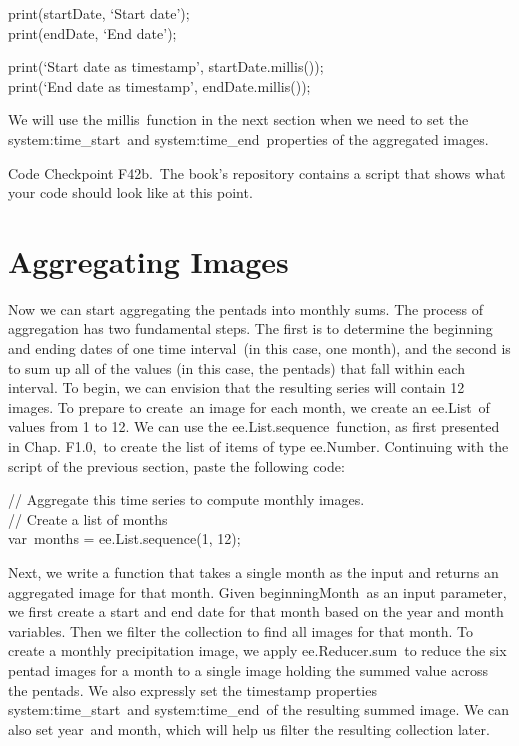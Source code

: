 \documentclass[
  letterpaper,
  DIV=11,
  numbers=noendperiod]{scrreprt}
\begin{document}
print(startDate, `Start date');\\
print(endDate, `End date');

print(`Start date as timestamp', startDate.millis());\\
print(`End date as timestamp', endDate.millis());

We will use the millis~function in the next section when we need to set
the system:time\_start~and system:time\_end~properties of the aggregated
images.

\begin{tcolorbox}[enhanced jigsaw, left=2mm, breakable, rightrule=.15mm, opacityback=0, colframe=quarto-callout-note-color-frame, colbacktitle=quarto-callout-note-color!10!white, arc=.35mm, opacitybacktitle=0.6, toptitle=1mm, colback=white, leftrule=.75mm, title=\textcolor{quarto-callout-note-color}{\faInfo}\hspace{0.5em}{Note}, toprule=.15mm, bottomtitle=1mm, titlerule=0mm, bottomrule=.15mm, coltitle=black]

Code Checkpoint F42b.~The book's repository contains a script that shows
what your code should look like at this point.

\end{tcolorbox}

\hypertarget{aggregating-images}{%
\section{Aggregating Images}\label{aggregating-images}}

Now we can start aggregating the pentads into monthly sums. The process
of aggregation has two fundamental steps. The first is to determine the
beginning and ending dates of one time interval~(in this case, one
month), and the second is to sum up all of the values (in this case, the
pentads) that fall within each interval. To begin, we can envision that
the resulting series will contain 12 images. To prepare to create~an
image for each month, we create an ee.List~of values from 1 to 12. We
can use the ee.List.sequence~function, as first presented in Chap.
F1.0,~to create the list of items of type ee.Number. Continuing with the
script of the previous section, paste the following code:

// Aggregate this time series to compute monthly images.\\
// Create a list of months\\
var~months = ee.List.sequence(1, 12);

Next, we write a function that takes a single month as the input and
returns an aggregated image for that month. Given beginningMonth~as an
input parameter, we first create a start and end date for that month
based on the year and month variables. Then we filter the collection to
find all images for that month. To create a monthly precipitation image,
we apply ee.Reducer.sum~to reduce the six pentad images for a month to a
single image holding the summed value across the pentads. We also
expressly set the timestamp properties system:time\_start~and
system:time\_end~of the resulting summed image. We can also set year~and
month, which will help us filter the resulting collection later.
\end{document}
